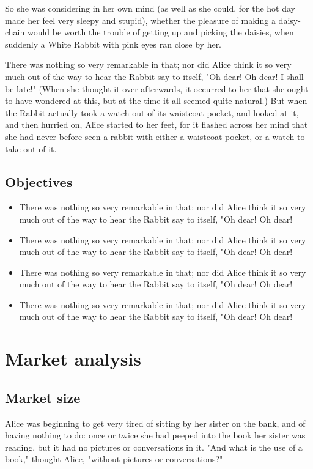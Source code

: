 \documentclass[12pt]{article}
\begin{document}
So she was considering in her own mind (as well as she could, for the hot day made her feel very sleepy and stupid), whether the pleasure of making a daisy-chain would be worth the trouble of getting up and picking the daisies, when suddenly a White Rabbit with pink eyes ran close by her.

There was nothing so very remarkable in that; nor did Alice think it so very much out of the way to hear the Rabbit say to itself, "Oh dear! Oh dear! I shall be late!" (When she thought it over afterwards, it occurred to her that she ought to have wondered at this, but at the time it all seemed quite natural.) But when the Rabbit actually took a watch out of its waistcoat-pocket, and looked at it, and then hurried on, Alice started to her feet, for it flashed across her mind that she had never before seen a rabbit with either a waistcoat-pocket, or a watch to take out of it. 

\subsection{Objectives}
\label{sec:orgheadline11}
\begin{itemize}
\item There was nothing so very remarkable in that; nor did Alice think it so very much out of the way to hear the Rabbit say to itself, "Oh dear! Oh dear!
\item There was nothing so very remarkable in that; nor did Alice think it so very much out of the way to hear the Rabbit say to itself, "Oh dear! Oh dear!
\item There was nothing so very remarkable in that; nor did Alice think it so very much out of the way to hear the Rabbit say to itself, "Oh dear! Oh dear!
\item There was nothing so very remarkable in that; nor did Alice think it so very much out of the way to hear the Rabbit say to itself, "Oh dear! Oh dear!
\end{itemize}

\section{Market analysis}
\label{sec:orgheadline24}

\subsection{Market size}
\label{sec:orgheadline13}
Alice was beginning to get very tired of sitting by her sister on the bank, and of having nothing to do: once or twice she had peeped into the book her sister was reading, but it had no pictures or conversations in it. "And what is the use of a book," thought Alice, "without pictures or conversations?" 
\end{document}
